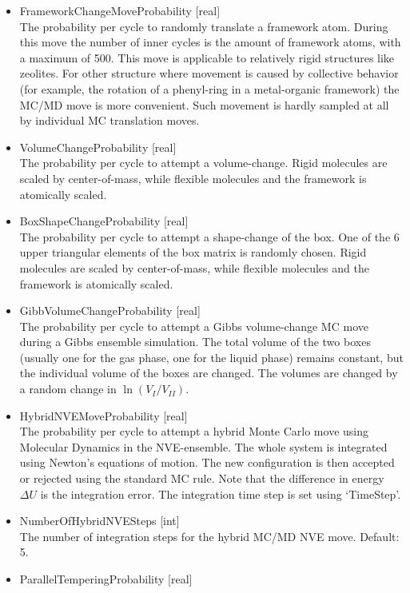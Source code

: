 \begin{itemize}
\item{FrameworkChangeMoveProbability [real]}\\
The probability per cycle to randomly translate a framework atom. During this move the number of inner cycles is the amount of framework atoms, with a maximum of 500.
This move is applicable to relatively rigid structures like zeolites. For other structure where movement is caused by collective behavior (for example, the rotation of a phenyl-ring
in a metal-organic framework) the MC/MD move is more convenient. Such movement is hardly sampled at all by individual MC translation moves.
\item{VolumeChangeProbability [real]}\\
The probability per cycle to attempt a volume-change. Rigid molecules are scaled by center-of-mass, while flexible molecules and the framework is atomically scaled.
\item{BoxShapeChangeProbability [real]}\\
The probability per cycle to attempt a shape-change of the box. One of the 6 upper triangular elements of the box matrix is randomly chosen.
Rigid molecules are scaled by center-of-mass, while flexible molecules and the framework is atomically scaled.
\item{GibbVolumeChangeProbability [real]}\\
The probability per cycle to attempt a Gibbs volume-change MC move during a Gibbs ensemble simulation. The total volume of the two boxes 
(usually one for the gas phase, one for the liquid phase) remains constant, but the individual volume of the boxes are changed.
The volumes are changed by a random change in $\ln(V_I/V_{II})$.
\item{HybridNVEMoveProbability [real]}\\
The probability per cycle to attempt a hybrid Monte Carlo move using Molecular Dynamics in the NVE-ensemble.
The whole system is integrated using Newton's equations of motion. The new configuration
is then accepted or rejected using the standard MC rule. Note that the difference in energy $\Delta U$ is the integration error. The integration time step is set using
`TimeStep'.
\item{NumberOfHybridNVESteps [int]}\\
The number of integration steps for the hybrid MC/MD NVE move. Default: 5.
\item{ParallelTemperingProbability [real]}\\

\end{itemize}
